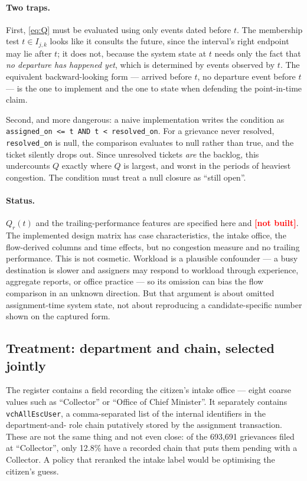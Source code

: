 \documentclass[11pt,a4paper]{article}
\theoremstyle{plain}
\theoremstyle{definition}
\theoremstyle{remark}
\newcommand{\code}[1]{\texttt{\small #1}}
\newcommand{\notbuilt}{\textcolor{red}{\textbf{[not built]}}}
\begin{document}
\paragraph{Two traps.} First, \eqref{eq:Q} must be evaluated using only events dated before
$t$. The membership test $t\in I_{j,k}$ looks like it consults the future, since the interval's
right endpoint may lie after $t$; it does not, because the system state at $t$ needs only
the fact that \emph{no departure has happened yet}, which is determined by events observed by
$t$. The equivalent
backward-looking form --- arrived before $t$, no departure event before $t$ --- is the one to
implement and the one to state when defending the point-in-time claim.

Second, and more dangerous: a naive implementation writes the condition as
\code{assigned\_on <= t AND t < resolved\_on}. For a grievance never resolved,
\code{resolved\_on} is null, the comparison evaluates to null rather than true, and the ticket
silently drops out. Since unresolved tickets \emph{are} the backlog, this undercounts $Q$
exactly where $Q$ is largest, and worst in the periods of heaviest congestion. The condition
must treat a null closure as ``still open''.

\paragraph{Status.} $Q_r(t)$ and the trailing-performance features are specified here and
\notbuilt. The implemented design matrix has case characteristics, the intake office, the
flow-derived columns and time effects, but no congestion measure and no trailing performance.
This is not cosmetic. Workload is a plausible confounder --- a busy destination is slower and
assigners may respond to workload through experience, aggregate reports, or office practice ---
so its omission can bias the flow comparison in an unknown direction. But that argument is
about omitted assignment-time system state, not about reproducing a candidate-specific number
shown on the captured form.

\subsection{Treatment: department and chain, selected jointly}\label{sec:flow}

The register contains a field recording the citizen's intake office --- eight coarse values
such as ``Collector'' or ``Office of Chief Minister''. It separately contains
\code{vchAllEscUser}, a comma-separated list of the internal identifiers in the department-and-
role chain putatively stored by the assignment transaction. These are not the same thing and not
even close: of the 693,691 grievances filed at ``Collector'', only 12.8\% have a recorded chain
that puts them pending with a Collector. A policy that reranked the intake label would be
optimising the citizen's guess.
\end{document}
